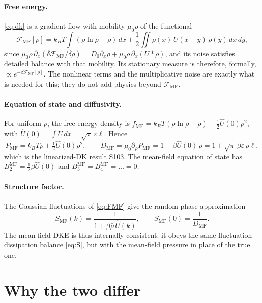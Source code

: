 \documentclass[11pt]{article}
\newcommand{\Uh}{\hat U}
\newcommand{\MF}{\mathrm{MF}}
\begin{document}
\paragraph{Free energy.} \eqref{eq:dk} is a gradient flow with mobility
$\mu_0\rho$ of the functional
\begin{equation}\label{eq:FMF}
  \mathcal F_\MF[\rho] = k_BT\!\int(\rho\ln\rho-\rho)\,dx
     + \frac12\iint \rho(x)\,U(x-y)\,\rho(y)\,dx\,dy ,
\end{equation}
since $\mu_0\rho\,\partial_x(\delta\mathcal F_\MF/\delta\rho)
= D_0\partial_x\rho + \mu_0\rho\,\partial_x(U*\rho)$, and its noise satisfies
detailed balance with that mobility. Its stationary measure is therefore,
formally, $\propto e^{-\beta\mathcal F_\MF[\rho]}$. The nonlinear terms and the
multiplicative noise are exactly what is needed for this; they do not add
physics beyond $\mathcal F_\MF$.

\paragraph{Equation of state and diffusivity.} For uniform $\rho$, the free
energy density is $f_\MF = k_BT(\rho\ln\rho-\rho) + \tfrac12\Uh(0)\rho^2$, with
$\Uh(0)=\int U\,dx = \sqrt\pi\,\varepsilon\ell$. Hence
\begin{equation}\label{eq:DMF}
  P_\MF = k_BT\rho + \tfrac12\Uh(0)\rho^2, \qquad
  D_\MF = \mu_0\partial_\rho P_\MF = 1 + \beta\Uh(0)\,\rho
        = 1 + \sqrt\pi\,\beta\varepsilon\,\rho\ell ,
\end{equation}
which is the linearized-DK result S103. The mean-field equation of state has
$B_2^\MF = \tfrac12\beta\Uh(0)$ and $B_3^\MF=B_4^\MF=\dots=0$.

\paragraph{Structure factor.} The Gaussian fluctuations of \eqref{eq:FMF} give
the random-phase approximation
\begin{equation}\label{eq:SMF}
  S_\MF(k) = \frac{1}{1+\beta\bar\rho\,\Uh(k)}, \qquad
  S_\MF(0) = \frac{1}{D_\MF}.
\end{equation}
The mean-field DKE is thus internally consistent: it obeys the same
fluctuation--dissipation balance \eqref{eq:S}, but with the mean-field
pressure in place of the true one.

\section{Why the two differ}\label{sec:why}
\end{document}
